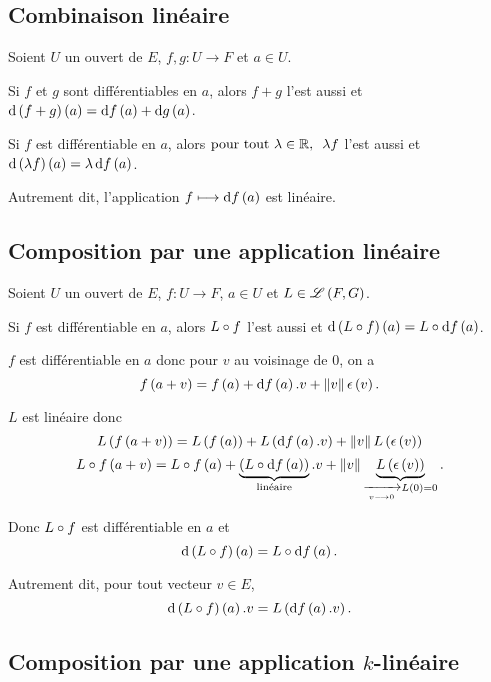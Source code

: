 \subsection{Combinaison linéaire}

\begin{prop}
Soient \(U\) un ouvert de \(E\), \(f,g:U\to F\) et \(a\in U\).

Si \(f\) et \(g\) sont différentiables en \(a\), alors \(f+g\) l'est aussi et \(\odif{\paren{f+g}}\paren{a}=\odif{f}\paren{a}+\odif{g}\paren{a}\).

Si \(f\) est différentiable en \(a\), alors \(\quantifs{\tpt\lambda\in\R}\lambda f\) l'est aussi et \(\odif{\paren{\lambda f}}\paren{a}=\lambda\odif{f}\paren{a}\).
\end{prop}

Autrement dit, l'application \(f\mapsto\odif{f}\paren{a}\) est linéaire.

\subsection{Composition par une application linéaire}

\begin{prop}
Soient \(U\) un ouvert de \(E\), \(f:U\to F\), \(a\in U\) et \(L\in\mathscr{L}\left(F,G\right)\).

Si \(f\) est différentiable en \(a\), alors \(L\circ f\) l'est aussi et \(\odif{\paren{L\rond f}}\paren{a}=L\rond\odif{f}\paren{a}\).
\end{prop}

\begin{dem}
\(f\) est différentiable en \(a\) donc pour \(v\) au voisinage de \(0\), on a \[f\paren{a+v}=f\paren{a}+\odif{f}\paren{a}.v+\norme{v}\epsilon\paren{v}.\]

\(L\) est linéaire donc \[L\paren{f\paren{a+v}}=L\paren{f\paren{a}}+L\paren{\odif{f}\paren{a}.v}+\norme{v}L\paren{\epsilon\paren{v}}\] \ie \[L\rond f\paren{a+v}=L\rond f\paren{a}+\underbrace{\paren{L\rond\odif{f}\paren{a}}}_{\text{linéaire}}.v+\norme{v}\underbrace{L\paren{\epsilon\paren{v}}}_{\tendqd{v\to0}L\paren{0}=0}.\]

Donc \(L\circ f\) est différentiable en \(a\) et \[\odif{\paren{L\rond f}}\paren{a}=L\rond\odif{f}\paren{a}.\]
\end{dem}

Autrement dit, pour tout vecteur \(v\in E\), \[\odif{\paren{L\rond f}}\paren{a}.v=L\paren{\odif{f}\paren{a}.v}.\]

\subsection{Composition par une application \(k\)-linéaire}


